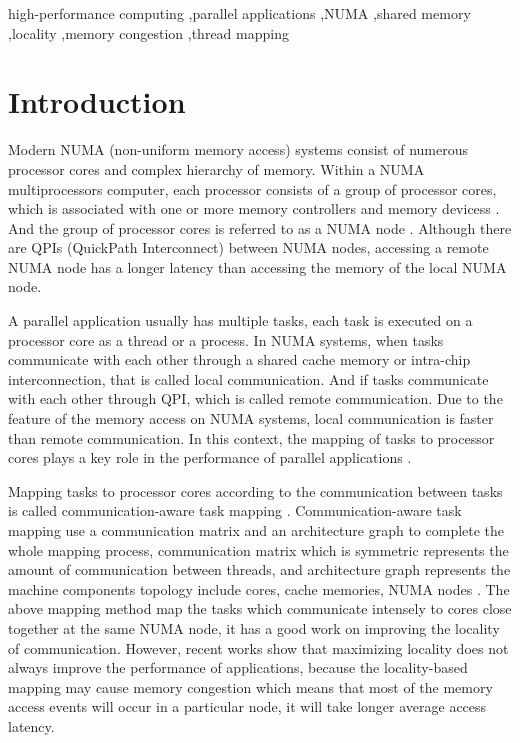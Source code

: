 \documentclass[a4paper,fleqn]{cas-sc}
\begin{document}
\begin{keywords}
high-performance computing \sep parallel applications \sep NUMA \sep shared memory \sep locality \sep memory congestion \sep thread mapping
\end{keywords}


\maketitle


\section{Introduction}

Modern NUMA (non-uniform memory access) systems consist of numerous processor cores and complex hierarchy of memory. Within a NUMA multiprocessors computer, each processor consists of a group of processor cores, which is associated with one or more memory controllers and memory devicess \cite{1}. And the group of processor cores is referred to as a NUMA node \cite{2, 3}. Although there are QPIs \cite{4} (QuickPath Interconnect) between NUMA nodes, accessing a remote NUMA node has a longer latency than accessing the memory of the local NUMA node.

A parallel application usually has multiple tasks, each task is executed on a processor core as a thread or a process. In NUMA systems, when tasks communicate with each other through a shared cache memory or intra-chip interconnection, that is called local communication. And if tasks communicate with each other through QPI, which is called remote communication. Due to the feature of the memory access on NUMA systems, local communication is faster than remote communication. In this context, the mapping of tasks to processor cores plays a key role in the performance of parallel applications \cite{5}.

Mapping tasks to processor cores according to the communication between tasks is called communication-aware task mapping \cite{6}. Communication-aware task mapping use a communication matrix and an architecture graph to complete the whole mapping process, communication matrix which is symmetric represents the amount of communication between threads, and architecture graph represents the machine components topology include cores, cache memories, NUMA nodes \cite{5}. The above mapping method map the tasks which communicate intensely to cores close together at the same NUMA node, it has a good work on improving the locality of communication. However, recent works \cite{2, 7} show that maximizing locality does not always improve the performance of applications, because the locality-based mapping may cause memory congestion which means that most of the memory access events will occur in a particular node, it will take longer average access latency. 
\end{document}
